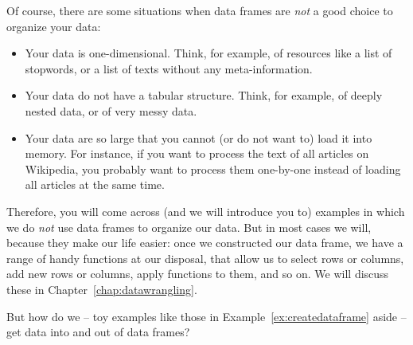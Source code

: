 Of course, there are some situations when data frames are \emph{not} a good choice to organize your data:
\begin{itemize}
\item Your data is one-dimensional. Think, for example, of resources like a list of stopwords, or a list of texts without any meta-information.
\item Your data do not have a tabular structure. Think, for example, of deeply nested data, or of very messy data.
\item Your data are so large that you cannot (or do not want to) load it into memory. For instance, if you want to process the text of all articles on Wikipedia, you probably want to process them one-by-one instead of loading all articles at the same time.
\end{itemize}



Therefore, you will come across (and we will introduce you to) examples in which we do \emph{not} use data frames to organize our data.
But in most cases we will, because they make our life easier:
once we constructed our data frame, we have a range of handy functions at our disposal, that allow us to select rows or columns, add new rows or columns, apply functions to them, and so on.
We will discuss these in Chapter~\ref{chap:datawrangling}.

But how do we -- toy examples like those in Example~\ref{ex:createdataframe} aside -- get data into and out of data frames?






